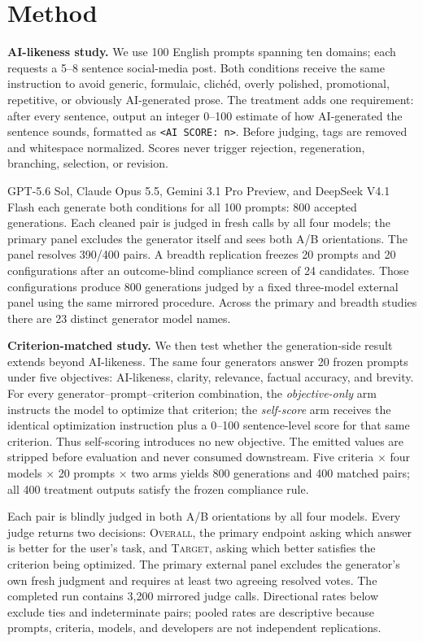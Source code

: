 \documentclass[11pt]{article}
\newcommand{\scoretag}{\texttt{<AI SCORE: n>}}
\begin{document}
\section{Method}

\textbf{AI-likeness study.} We use 100 English prompts spanning ten domains; each requests a 5--8 sentence social-media post. Both conditions receive the same instruction to avoid generic, formulaic, clich\'ed, overly polished, promotional, repetitive, or obviously AI-generated prose. The treatment adds one requirement: after every sentence, output an integer 0--100 estimate of how AI-generated the sentence sounds, formatted as \scoretag{}. Before judging, tags are removed and whitespace normalized. Scores never trigger rejection, regeneration, branching, selection, or revision.

GPT-5.6 Sol, Claude Opus 5.5, Gemini 3.1 Pro Preview, and DeepSeek V4.1 Flash each generate both conditions for all 100 prompts: 800 accepted generations. Each cleaned pair is judged in fresh calls by all four models; the primary panel excludes the generator itself and sees both A/B orientations. The panel resolves 390/400 pairs. A breadth replication freezes 20 prompts and 20 configurations after an outcome-blind compliance screen of 24 candidates. Those configurations produce 800 generations judged by a fixed three-model external panel using the same mirrored procedure. Across the primary and breadth studies there are 23 distinct generator model names.

\textbf{Criterion-matched study.} We then test whether the generation-side result extends beyond AI-likeness. The same four generators answer 20 frozen prompts under five objectives: AI-likeness, clarity, relevance, factual accuracy, and brevity. For every generator--prompt--criterion combination, the \emph{objective-only} arm instructs the model to optimize that criterion; the \emph{self-score} arm receives the identical optimization instruction plus a 0--100 sentence-level score for that same criterion. Thus self-scoring introduces no new objective. The emitted values are stripped before evaluation and never consumed downstream. Five criteria $\times$ four models $\times$ 20 prompts $\times$ two arms yields 800 generations and 400 matched pairs; all 400 treatment outputs satisfy the frozen compliance rule.

Each pair is blindly judged in both A/B orientations by all four models. Every judge returns two decisions: \textsc{Overall}, the primary endpoint asking which answer is better for the user's task, and \textsc{Target}, asking which better satisfies the criterion being optimized. The primary external panel excludes the generator's own fresh judgment and requires at least two agreeing resolved votes. The completed run contains 3,200 mirrored judge calls. Directional rates below exclude ties and indeterminate pairs; pooled rates are descriptive because prompts, criteria, models, and developers are not independent replications.
\end{document}
